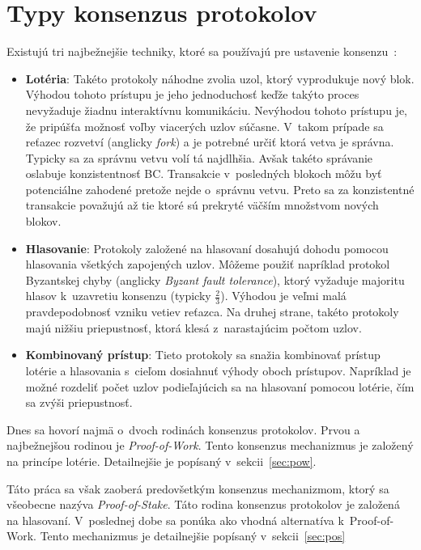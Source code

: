 \section{Typy konsenzus protokolov}
Existujú tri najbežnejšie techniky, ktoré sa používajú pre ustavenie konsenzu~\cite{zhangConsensus, homoliakBlockchain}:
\begin{itemize}
	\item \textbf{Lotéria}: Takéto protokoly náhodne zvolia uzol, ktorý vyprodukuje nový blok. Výhodou tohoto prístupu je jeho jednoduchosť keďže takýto proces nevyžaduje žiadnu interaktívnu komunikáciu. Nevýhodou tohoto prístupu je, že pripúšťa možnosť voľby viacerých uzlov súčasne. V~takom prípade sa reťazec rozvetví (anglicky \textit{fork}) a je potrebné určiť ktorá vetva je správna. Typicky sa za správnu vetvu volí tá najdlhšia. Avšak takéto správanie oslabuje konzistentnosť BC. Transakcie v~posledných blokoch môžu byť potenciálne zahodené pretože nejde o~správnu vetvu. Preto sa za konzistentné transakcie považujú až tie ktoré sú prekryté väčším množstvom nových blokov.
	\item \textbf{Hlasovanie}: Protokoly založené na hlasovaní dosahujú dohodu pomocou hlasovania všetkých zapojených uzlov. Môžeme použiť napríklad protokol Byzantskej chyby (anglicky \textit{Byzant fault tolerance}), ktorý vyžaduje majoritu hlasov k~uzavretiu konsenzu (typicky $\frac{2}{3}$). Výhodou je veľmi malá pravdepodobnosť vzniku vetiev reťazca. Na druhej strane, takéto protokoly majú nižšiu priepustnosť, ktorá klesá z~narastajúcim počtom uzlov.
	\item \textbf{Kombinovaný prístup}: Tieto protokoly sa snažia kombinovať prístup lotérie a hlasovania s~cieľom dosiahnuť výhody oboch prístupov. Napríklad je možné rozdeliť počet uzlov podieľajúcich sa na hlasovaní pomocou lotérie, čím sa zvýši priepustnosť.
\end{itemize}

Dnes sa hovorí najmä o~dvoch rodinách konsenzus protokolov. Prvou a najbežnejšou rodinou je \textit{Proof-of-Work}. Tento konsenzus mechanizmus je založený na princípe lotérie. Detailnejšie je popísaný v~sekcii~\ref{sec:pow}.

Táto práca sa však zaoberá predovšetkým konsenzus mechanizmom, ktorý sa všeobecne nazýva \textit{Proof-of-Stake}. Táto rodina konsenzus protokolov je založená na hlasovaní. V~poslednej dobe sa ponúka ako vhodná alternatíva k~Proof-of-Work. Tento mechanizmus je detailnejšie popísaný v~sekcii~\ref{sec:pos}

